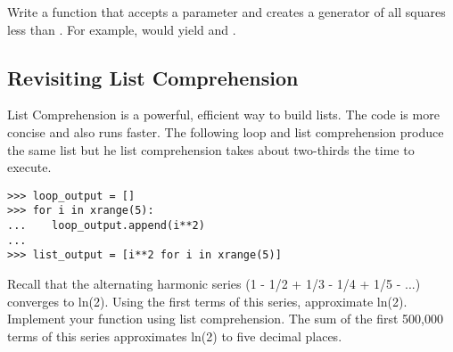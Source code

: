 \begin{problem}
Write a function  that accepts a parameter  and creates a generator of all squares less than . For example,  would yield  and .
\end{problem}


\subsection*{Revisiting List Comprehension}
List Comprehension is a powerful, efficient way to build lists.  The code is more concise and also runs faster.  The following  loop and list comprehension produce the same list but he list comprehension takes about two-thirds the time to execute.

\begin{lstlisting}
>>> loop_output = []
>>> for i in xrange(5):
...    loop_output.append(i**2)
...
>>> list_output = [i**2 for i in xrange(5)]
\end{lstlisting}

\begin{problem}
Recall that the alternating harmonic series (1 - 1/2 + 1/3 - 1/4 + 1/5 - ...) converges to ln(2). Using the first  terms of this series, approximate ln(2).  Implement your function using list comprehension.  The sum of the first 500,000 terms of this series approximates ln(2) to five decimal places.
\end{problem}

\begin{comment}
\section*{Specifications}
We suggest that you submit your solutions in a file called \li{solutions.py}, using the following format.

\end{comment}
